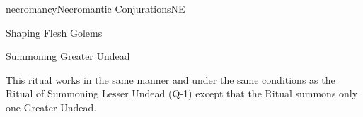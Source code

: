 \begin{College}[1.1]{necromancy}{Necromantic Conjurations}{NE}
\begin{ritual}[R-4]{Shaping Flesh Golems}
\begin{effects}
\end{effects}
\end{ritual}

\begin{ritual}[R-5]{Summoning Greater Undead}

\begin{effects}
This ritual works in the same manner and under the same conditions as
the Ritual of Summoning Lesser Undead (Q-1) except that the Ritual
summons only one Greater Undead.
\end{effects}
\end{ritual}

\end{College}
